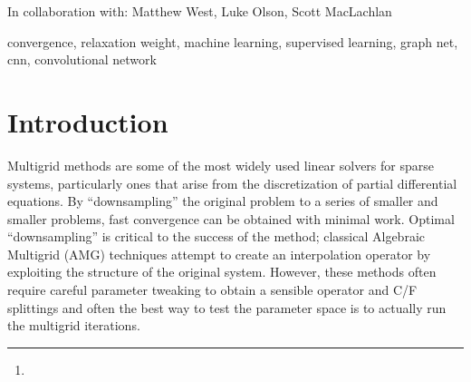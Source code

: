 \documentclass[review]{siamart190516}
\author{\TheName\thanks{\TheAddress}}
\title{{\TheTitle}}
\newcommand{\TheCollaborators}{%
  Matthew West,
  Luke Olson,
  Scott MacLachlan
}
\begin{document}
\maketitle

\begin{center}
In collaboration with:
  {\TheCollaborators}
\end{center}
\vspace{1cm}

\begin{abstract}
  
\end{abstract}

\begin{keywords}
  convergence, relaxation weight, machine learning, supervised learning, graph net, cnn, convolutional network
\end{keywords}

\section{Introduction}\label{sec:intro}

Multigrid methods are some of the most widely used linear solvers for sparse systems, particularly ones that arise from the discretization of partial differential equations.  By ``downsampling'' the original problem to a series of smaller and smaller problems, fast convergence can be obtained with minimal work\cite{mgtut}.  Optimal ``downsampling'' is critical to the success of the method; classical Algebraic Multigrid (AMG) techniques attempt to create an interpolation operator by exploiting the structure of the original system\cite{rs}.  However, these methods often require careful parameter tweaking to obtain a sensible operator and C/F splittings and often the best way to test the parameter space is to actually run the multigrid iterations.

\end{document}
